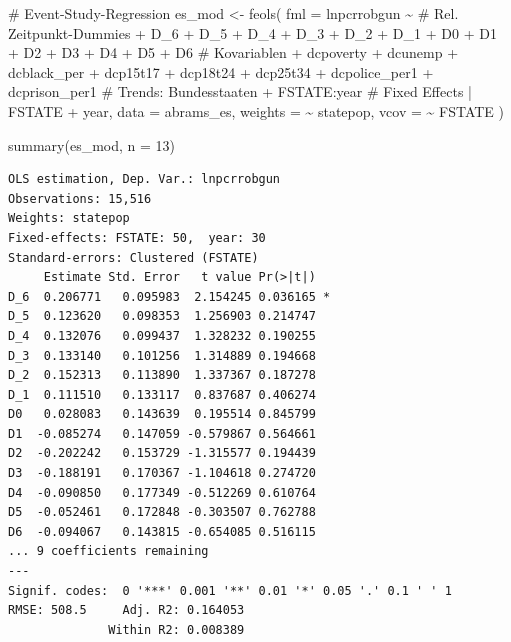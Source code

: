 \documentclass[
  a4paper,
  DIV=11,
  oneside]{scrreprt}
\newenvironment{Shaded}{\begin{snugshade}}{\end{snugshade}}
\newcommand{\AttributeTok}[1]{\textcolor[rgb]{0.40,0.45,0.13}{#1}}
\newcommand{\CommentTok}[1]{\textcolor[rgb]{0.37,0.37,0.37}{#1}}
\newcommand{\DecValTok}[1]{\textcolor[rgb]{0.68,0.00,0.00}{#1}}
\newcommand{\FunctionTok}[1]{\textcolor[rgb]{0.28,0.35,0.67}{#1}}
\newcommand{\NormalTok}[1]{\textcolor[rgb]{0.00,0.23,0.31}{#1}}
\newcommand{\OtherTok}[1]{\textcolor[rgb]{0.00,0.23,0.31}{#1}}
\newcommand{\SpecialCharTok}[1]{\textcolor[rgb]{0.37,0.37,0.37}{#1}}
\begin{document}
\begin{Shaded}
\begin{Highlighting}[]
\CommentTok{\# Event{-}Study{-}Regression}
\NormalTok{es\_mod }\OtherTok{\textless{}{-}} \FunctionTok{feols}\NormalTok{(}
  \AttributeTok{fml =}\NormalTok{ lnpcrrobgun }\SpecialCharTok{\textasciitilde{}}
      \CommentTok{\# Rel. Zeitpunkt{-}Dummies}
      \SpecialCharTok{+}\NormalTok{ D\_6}
      \SpecialCharTok{+}\NormalTok{ D\_5}
      \SpecialCharTok{+}\NormalTok{ D\_4}
      \SpecialCharTok{+}\NormalTok{ D\_3}
      \SpecialCharTok{+}\NormalTok{ D\_2}
      \SpecialCharTok{+}\NormalTok{ D\_1}
      \SpecialCharTok{+}\NormalTok{ D0      }
      \SpecialCharTok{+}\NormalTok{ D1}
      \SpecialCharTok{+}\NormalTok{ D2}
      \SpecialCharTok{+}\NormalTok{ D3}
      \SpecialCharTok{+}\NormalTok{ D4}
      \SpecialCharTok{+}\NormalTok{ D5}
      \SpecialCharTok{+}\NormalTok{ D6}
      \CommentTok{\# Kovariablen}
      \SpecialCharTok{+}\NormalTok{ dcpoverty}
      \SpecialCharTok{+}\NormalTok{ dcunemp}
      \SpecialCharTok{+}\NormalTok{ dcblack\_per}
      \SpecialCharTok{+}\NormalTok{ dcp15t17}
      \SpecialCharTok{+}\NormalTok{ dcp18t24 }
      \SpecialCharTok{+}\NormalTok{ dcp25t34}
      \SpecialCharTok{+}\NormalTok{ dcpolice\_per1}
      \SpecialCharTok{+}\NormalTok{ dcprison\_per1}
      \CommentTok{\# Trends: Bundesstaaten}
      \SpecialCharTok{+}\NormalTok{ FSTATE}\SpecialCharTok{:}\NormalTok{year}
      \CommentTok{\# Fixed Effects}
      \SpecialCharTok{|}\NormalTok{ FSTATE }\SpecialCharTok{+}\NormalTok{ year,}
       \AttributeTok{data =}\NormalTok{ abrams\_es,}
      \AttributeTok{weights =} \SpecialCharTok{\textasciitilde{}}\NormalTok{ statepop, }
      \AttributeTok{vcov =} \SpecialCharTok{\textasciitilde{}}\NormalTok{ FSTATE}
\NormalTok{)}

\FunctionTok{summary}\NormalTok{(es\_mod, }\AttributeTok{n =} \DecValTok{13}\NormalTok{)}
\end{Highlighting}
\end{Shaded}

\begin{verbatim}
OLS estimation, Dep. Var.: lnpcrrobgun
Observations: 15,516
Weights: statepop
Fixed-effects: FSTATE: 50,  year: 30
Standard-errors: Clustered (FSTATE) 
     Estimate Std. Error   t value Pr(>|t|)    
D_6  0.206771   0.095983  2.154245 0.036165 *  
D_5  0.123620   0.098353  1.256903 0.214747    
D_4  0.132076   0.099437  1.328232 0.190255    
D_3  0.133140   0.101256  1.314889 0.194668    
D_2  0.152313   0.113890  1.337367 0.187278    
D_1  0.111510   0.133117  0.837687 0.406274    
D0   0.028083   0.143639  0.195514 0.845799    
D1  -0.085274   0.147059 -0.579867 0.564661    
D2  -0.202242   0.153729 -1.315577 0.194439    
D3  -0.188191   0.170367 -1.104618 0.274720    
D4  -0.090850   0.177349 -0.512269 0.610764    
D5  -0.052461   0.172848 -0.303507 0.762788    
D6  -0.094067   0.143815 -0.654085 0.516115    
... 9 coefficients remaining
---
Signif. codes:  0 '***' 0.001 '**' 0.01 '*' 0.05 '.' 0.1 ' ' 1
RMSE: 508.5     Adj. R2: 0.164053
              Within R2: 0.008389
\end{verbatim}
\end{document}
